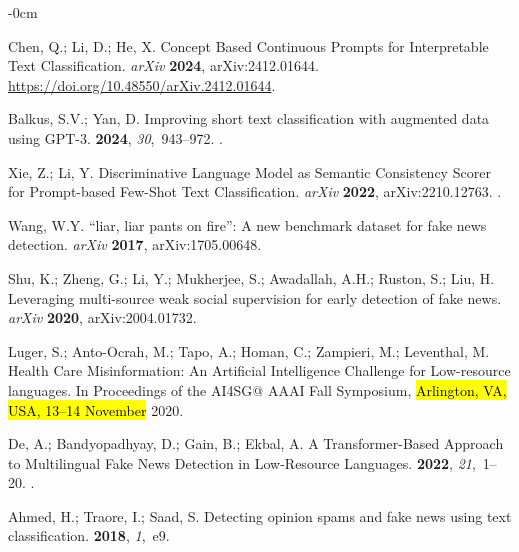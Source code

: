 \documentclass[electronics,article,accept,pdftex,moreauthors,electronics]{Definitions/mdpi}
\begin{document}
\begin{adjustwidth}{-\extralength}{0cm}
\begin{thebibliography}{999}
Chen, Q.; Li, D.; He, X.
\newblock Concept {Based} {Continuous} {Prompts} for {Interpretable} {Text}
  {Classification}. \emph{arXiv} \textbf{2024}, arXiv:2412.01644.
  {\url{https://doi.org/10.48550/arXiv.2412.01644}}.

Balkus, S.V.; Yan, D.
\newblock Improving short text classification with augmented data using {GPT}-3.
 {\bf 2024}, {\em 30},~943--972.
.

Xie, Z.; Li, Y.
\newblock Discriminative {Language} {Model} as {Semantic} {Consistency}
  {Scorer} for {Prompt}-based {Few}-{Shot} {Text} {Classification}. \emph{arXiv} \textbf{2022}, arXiv:2210.12763.
.

Wang, W.Y.
\newblock ``liar, liar pants on fire'': A new benchmark dataset for fake news detection.
\newblock \emph{arXiv} {\bf 2017}, arXiv:1705.00648.

Shu, K.; Zheng, G.; Li, Y.; Mukherjee, S.; Awadallah, A.H.; Ruston, S.; Liu, H.
\newblock Leveraging multi-source weak social supervision for early detection
  of fake news.
\newblock \emph{arXiv} {\bf 2020}, arXiv:2004.01732.

Luger, S.; Anto-Ocrah, M.; Tapo, A.; Homan, C.; Zampieri, M.; Leventhal, M.
\newblock Health Care Misinformation: An Artificial Intelligence Challenge for
  Low-resource languages.
\newblock In Proceedings of the AI4SG@ AAAI Fall Symposium, \hl{Arlington, VA, USA, 13--14 November} %
 2020.

De, A.; Bandyopadhyay, D.; Gain, B.; Ekbal, A.
\newblock A {Transformer}-{Based} {Approach} to {Multilingual} {Fake} {News}
  {Detection} in {Low}-{Resource} {Languages}.
 {\bf 2022}, {\em 21},~1--20.
.

Ahmed, H.; Traore, I.; Saad, S.
\newblock Detecting opinion spams and fake news using text classification.
 {\bf 2018}, {\em 1},~e9.


\end{thebibliography}
\end{adjustwidth}
\end{document}
